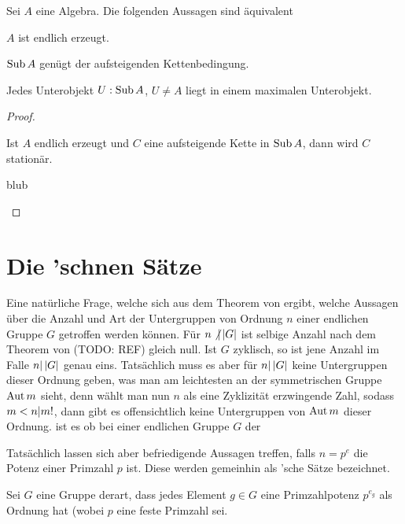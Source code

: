 \begin{theorem}
    Sei $A$ eine Algebra. Die folgenden Aussagen sind äquivalent
    \begin{statements}
            \item $A$ ist endlich erzeugt.
            \item $\mathop{\mathrm{Sub}} A$ genügt der aufsteigenden Kettenbedingung.
            \item Jedes Unterobjekt $U:\mathop{\mathrm{Sub}} A$, $U\neq A$ liegt in einem maximalen Unterobjekt.
    \end{statements}
\end{theorem}

\begin{proof}
    \begin{implications}
            \item Ist $A$ endlich erzeugt und $C$ eine aufsteigende Kette in $\mathop{\mathrm{Sub}} A$, dann wird $C$ stationär.
            \item
        \item blub
    \end{implications}
\end{proof}

\section{Die 'schnen Sätze}

Eine natürliche Frage, welche sich aus dem Theorem von  ergibt, welche Aussagen über die Anzahl und Art der
Untergruppen von Ordnung $n$ einer endlichen Gruppe $G$ getroffen werden können.
Für $n\not| \left\vert{G}\right\vert$ ist selbige Anzahl nach dem Theorem von  (TODO: REF) gleich null. Ist $G$ zyklisch, so
ist jene Anzahl im Falle $n| \left\vert{G}\right\vert$ genau eins. Tatsächlich muss es aber für $n| \left\vert{G}\right\vert$ keine Untergruppen dieser
Ordnung geben, was man am leichtesten an der symmetrischen Gruppe $\mathop{\mathrm{Aut}}\nolimits m$ sieht, denn wählt man nun $n$ als eine Zyklizität
erzwingende Zahl, sodass $m<n| m!$, dann gibt es offensichtlich keine Untergruppen von $\mathop{\mathrm{Aut}}\nolimits m$ dieser Ordnung.
ist es ob bei einer endlichen Gruppe $G$ der

Tatsächlich lassen sich aber befriedigende Aussagen treffen, falls $n=p^e$ die Potenz einer Primzahl $p$ ist. Diese werden
gemeinhin als 'sche Sätze bezeichnet.

\begin{definition}[$p$-Gruppe]
    Sei $G$ eine Gruppe derart, dass jedes Element $g\in G$ eine Primzahlpotenz $p^{e_g}$ als Ordnung hat (wobei $p$ eine feste
    Primzahl sei.
\end{definition}

